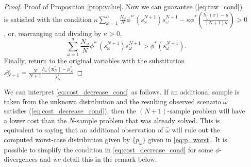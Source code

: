\documentclass[ijoc,letterpaper]{informs3} %
\newcommand{\x}{\mathbf{x}}
\begin{document}
\begin{proof}{\sc Proof of Proposition \ref{prop:value}.}
	Now we can guarantee (\ref{eq:raw_cond}) is satisfied with the condition $\kappa \sum_{\omega=1}^n \frac{N_\omega}{N} \phi^{*\prime}(s^{N+1}_\omega) s^{N+1}_\omega - \kappa \phi^*\left(\frac{h^\dagger_{\hat{\omega}}(x) - \mu}{(N+1)\kappa}\right) > 0$, or, rearranging and dividing by $\kappa > 0$,
	\begin{equation} \label{eq:main_value_derivation}
		\sum_{\omega=1}^n \frac{N_\omega}{N} \phi^{*\prime}(s^{N+1}_\omega) s^{N+1}_\omega > \phi^*(s^{N+1}_\omega).
	\end{equation}
	Finally, return to the original variables with the substitution $s^\omega_{N+1} = \frac{N}{N+1} \frac{h_\omega(\x^*_N) - \mu^*_N}{\lambda^*_N}$
	\Halmos
\end{proof}


We can interpret \eqref{eq:cost_decrease_cond} as follows. If an additional sample is taken from the unknown distribution and the resulting observed scenario $\hat{\omega}$ satisfies (\ref{eq:cost_decrease_cond}), then the $(N+1)$-sample problem will have a lower cost than the $N$-sample problem that was already solved.
This is equivalent to saying that an additional observation of $\hat{\omega}$ will rule out the computed worst-case distribution given by $\{p_\omega\}$ given in \eqref{eq:p_worst}.
It is possible to simplify the condition in \eqref{eq:cost_decrease_cond} for some $\phi$-divergences and we detail this in the remark below. 
\end{document}
